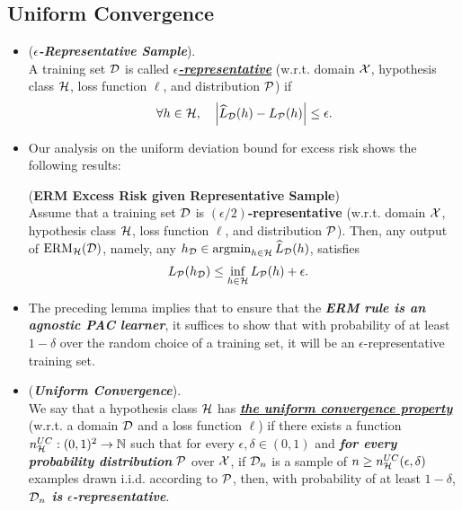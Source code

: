 \documentclass[11pt]{article}
\begin{document}
\subsection{Uniform Convergence}
\begin{itemize}
\item \begin{definition} (\textbf{\emph{$\epsilon$-Representative Sample}}). \citep{shalev2014understanding}\\
A training set ${\mathcal D}$ is called \underline{\emph{\textbf{$\epsilon$-representative}}} (w.r.t. domain ${\mathcal X}$, hypothesis class ${\mathcal H}$, loss function $\ell$, and distribution ${\mathcal P}$) if
\begin{align*}
\forall h\in {\mathcal H}, \quad \left\lvert \widehat{L}_{{\mathcal D}}(h) - L_{{\mathcal P}}(h) \right\rvert \le \epsilon.
\end{align*}
\end{definition}

\item Our analysis on the uniform deviation bound for excess risk shows the following results:
\begin{lemma} (\textbf{ERM Excess Risk given Representative Sample}) \citep{shalev2014understanding}\\
Assume that a training set ${\mathcal D}$ is \textbf{$(\epsilon/2)$-representative} (w.r.t. domain ${\mathcal X}$, hypothesis class ${\mathcal H}$, loss function $\ell$, and distribution ${\mathcal P}$). Then, any output of $\text{ERM}_{{\mathcal H}}({\mathcal D})$, namely, any $h_{{\mathcal D}} \in \operatorname{argmin}_{h \in {\mathcal H}}\widehat{L}_{{\mathcal D}}(h)$, satisfies
\begin{align*}
L_{{\mathcal P}}(h_{{\mathcal D}}) &\le \inf_{h \in {\mathcal H}}L_{{\mathcal P}}(h) + \epsilon.
\end{align*}
\end{lemma}

\item \begin{remark}
The preceding lemma implies that to ensure that the \emph{\textbf{ERM rule is an agnostic PAC learner}}, it suffices to show that with probability of at least $1 - \delta$ over the random choice of a training set, it will be an $\epsilon$-representative training set.
\end{remark}

\item \begin{definition} (\emph{\textbf{Uniform Convergence}}). \citep{shalev2014understanding}\\
We say that a hypothesis class ${\mathcal H}$ has  \underline{\emph{\textbf{the uniform convergence property}}} (w.r.t. a domain ${\mathcal D}$ and a loss function $\ell$) if there exists
a function $n^{UC}_{{\mathcal H}}: (0,1)^2 \to {\mathbb N}$ such that for every $\epsilon, \delta \in (0,1)$ and \emph{\textbf{for every probability distribution}} ${\mathcal P}$ over ${\mathcal X}$, if ${\mathcal D}_n$ is a sample of $n \ge n^{UC}_{{\mathcal H}}(\epsilon, \delta)$ examples drawn i.i.d. according to ${\mathcal P}$, then, with probability of at least $1 - \delta$, \textbf{\emph{${\mathcal D}_n$ is $\epsilon$-representative}}.
\end{definition}


\end{itemize}
\end{document}
